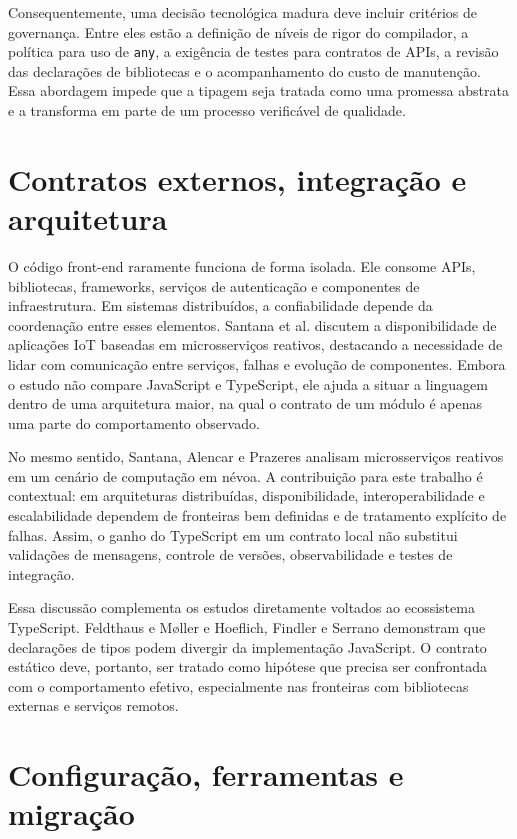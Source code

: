Consequentemente, uma decisão tecnológica madura deve incluir critérios de governança. Entre eles estão a definição de níveis de rigor do compilador, a política para uso de \texttt{any}, a exigência de testes para contratos de APIs, a revisão das declarações de bibliotecas e o acompanhamento do custo de manutenção. Essa abordagem impede que a tipagem seja tratada como uma promessa abstrata e a transforma em parte de um processo verificável de qualidade.

\section{Contratos externos, integração e arquitetura}

O código front-end raramente funciona de forma isolada. Ele consome APIs, bibliotecas, frameworks, serviços de autenticação e componentes de infraestrutura. Em sistemas distribuídos, a confiabilidade depende da coordenação entre esses elementos. Santana et al. \cite{santana2020availability} discutem a disponibilidade de aplicações IoT baseadas em microsserviços reativos, destacando a necessidade de lidar com comunicação entre serviços, falhas e evolução de componentes. Embora o estudo não compare JavaScript e TypeScript, ele ajuda a situar a linguagem dentro de uma arquitetura maior, na qual o contrato de um módulo é apenas uma parte do comportamento observado.

No mesmo sentido, Santana, Alencar e Prazeres \cite{santana2019reactive} analisam microsserviços reativos em um cenário de computação em névoa. A contribuição para este trabalho é contextual: em arquiteturas distribuídas, disponibilidade, interoperabilidade e escalabilidade dependem de fronteiras bem definidas e de tratamento explícito de falhas. Assim, o ganho do TypeScript em um contrato local não substitui validações de mensagens, controle de versões, observabilidade e testes de integração.

Essa discussão complementa os estudos diretamente voltados ao ecossistema TypeScript. Feldthaus e Møller \cite{feldthaus2014interfaces} e Hoeflich, Findler e Serrano \cite{hoeflich2022scotty} demonstram que declarações de tipos podem divergir da implementação JavaScript. O contrato estático deve, portanto, ser tratado como hipótese que precisa ser confrontada com o comportamento efetivo, especialmente nas fronteiras com bibliotecas externas e serviços remotos.

\section{Configuração, ferramentas e migração}

